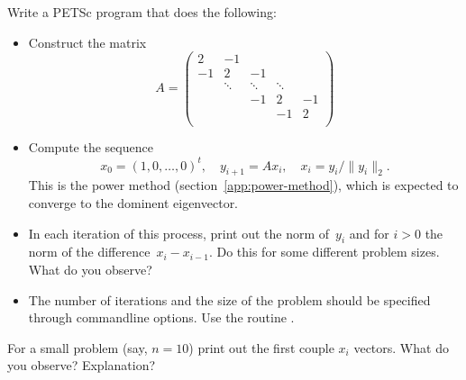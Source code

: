 Write a PETSc program that does the following:
\begin{itemize}
\item Construct the matrix
  \[
  A=
  \begin{pmatrix}
    2&-1\\ -1&2&-1\\ &\ddots&\ddots&\ddots\\ &&-1&2&-1\\ &&&-1&2\\
  \end{pmatrix}
  \]
\item Compute the sequence
  \[
  x_0=(1,0,\ldots,0)^t,\quad y_{i+1}=Ax_i,\quad x_i=y_i/\|y_i\|_2.
  \]
  This is the power method (section~\ref{app:power-method}), which is
  expected to converge to the dominent eigenvector.
\item In each iteration of this process, print out the norm of~$y_i$
  and for $i>0$ the norm of the difference~$x_i-x_{i-1}$. Do this for
  some different problem sizes. What do you observe?
\item The number of iterations and the size of the problem should be
  specified through commandline options. Use the routine
  .
\end{itemize}
For a small problem (say, $n=10$) print out the first couple $x_i$
vectors. What do you observe? Explanation?
